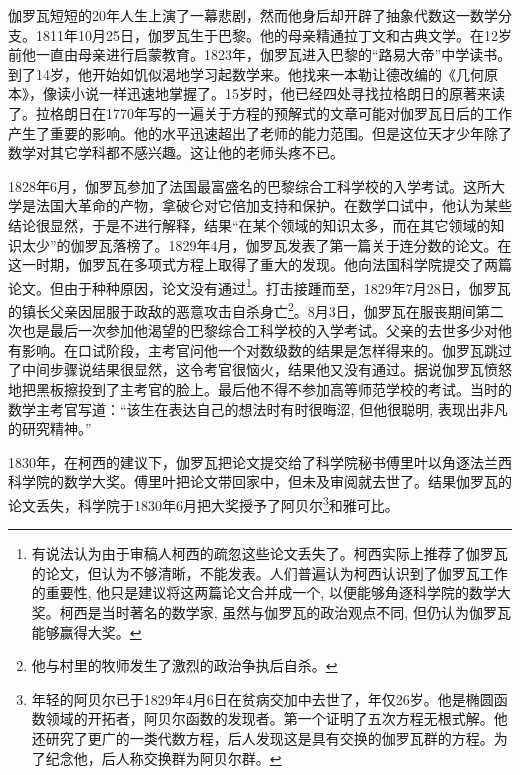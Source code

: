 \documentclass[b5paper]{ctexart}
\begin{document}
伽罗瓦短短的20年人生上演了一幕悲剧，然而他身后却开辟了抽象代数这一数学分支。1811年10月25日，伽罗瓦生于巴黎。他的母亲精通拉丁文和古典文学。在12岁前他一直由母亲进行启蒙教育。1823年，伽罗瓦进入巴黎的“路易大帝”中学读书。到了14岁，他开始如饥似渴地学习起数学来。他找来一本勒让德改编的《几何原本》，像读小说一样迅速地掌握了。15岁时，他已经四处寻找拉格朗日的原著来读了。拉格朗日在1770年写的一遍关于方程的预解式的文章可能对伽罗瓦日后的工作产生了重要的影响。他的水平迅速超出了老师的能力范围。但是这位天才少年除了数学对其它学科都不感兴趣。这让他的老师头疼不已。

1828年6月，伽罗瓦参加了法国最富盛名的巴黎综合工科学校的入学考试。这所大学是法国大革命的产物，拿破仑对它倍加支持和保护。在数学口试中，他认为某些结论很显然，于是不进行解释，结果“在某个领域的知识太多，而在其它领域的知识太少”的伽罗瓦落榜了。1829年4月，伽罗瓦发表了第一篇关于连分数的论文。在这一时期，伽罗瓦在多项式方程上取得了重大的发现。他向法国科学院提交了两篇论文。但由于种种原因，论文没有通过\footnote{有说法认为由于审稿人柯西的疏忽这些论文丢失了。柯西实际上推荐了伽罗瓦的论文，但认为不够清晰，不能发表。人们普遍认为柯西认识到了伽罗瓦工作的重要性, 他只是建议将这两篇论文合并成一个, 以便能够角逐科学院的数学大奖。柯西是当时著名的数学家, 虽然与伽罗瓦的政治观点不同, 但仍认为伽罗瓦能够赢得大奖。\cite{Wiki-Galois}}。打击接踵而至，1829年7月28日，伽罗瓦的镇长父亲因屈服于政敌的恶意攻击自杀身亡\footnote{他与村里的牧师发生了激烈的政治争执后自杀\cite{Wiki-Galois}。}。8月3日，伽罗瓦在服丧期间第二次也是最后一次参加他渴望的巴黎综合工科学校的入学考试。父亲的去世多少对他有影响。在口试阶段，主考官问他一个对数级数的结果是怎样得来的。伽罗瓦跳过了中间步骤说结果很显然，这令考官很恼火，结果他又没有通过。据说伽罗瓦愤怒地把黑板擦投到了主考官的脸上。最后他不得不参加高等师范学校的考试。当时的数学主考官写道：“该生在表达自己的想法时有时很晦涩, 但他很聪明, 表现出非凡的研究精神。”

1830年，在柯西的建议下，伽罗瓦把论文提交给了科学院秘书傅里叶以角逐法兰西科学院的数学大奖。傅里叶把论文带回家中，但未及审阅就去世了。结果伽罗瓦的论文丢失，科学院于1830年6月把大奖授予了阿贝尔\footnote{年轻的阿贝尔已于1829年4月6日在贫病交加中去世了，年仅26岁。他是椭圆函数领域的开拓者，阿贝尔函数的发现者。第一个证明了五次方程无根式解。他还研究了更广的一类代数方程，后人发现这是具有交换的伽罗瓦群的方程。为了纪念他，后人称交换群为阿贝尔群。}和雅可比\cite{HanXueTao2009}。
\end{document}
